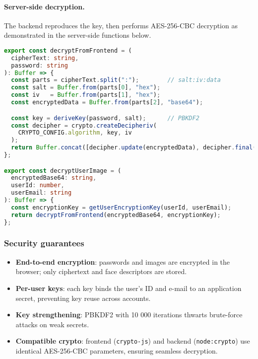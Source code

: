 \clearpage
\paragraph{Server-side decryption.}
The backend reproduces the key, then performs AES-256-CBC decryption as demonstrated in the server-side functions below.

\begin{lstlisting}[language=TypeScript, caption={Server-side decryption of encrypted data from the frontend}, label={lst:server-decryption}]
export const decryptFromFrontend = (
  cipherText: string,
  password: string
): Buffer => {
  const parts = cipherText.split(":");        // salt:iv:data
  const salt = Buffer.from(parts[0], "hex");
  const iv   = Buffer.from(parts[1], "hex");
  const encryptedData = Buffer.from(parts[2], "base64");

  const key = deriveKey(password, salt);      // PBKDF2
  const decipher = crypto.createDecipheriv(
    CRYPTO_CONFIG.algorithm, key, iv
  );
  return Buffer.concat([decipher.update(encryptedData), decipher.final()]);
};

export const decryptUserImage = (
  encryptedBase64: string,
  userId: number,
  userEmail: string
): Buffer => {
  const encryptionKey = getUserEncryptionKey(userId, userEmail);
  return decryptFromFrontend(encryptedBase64, encryptionKey);
};
\end{lstlisting}

\subsubsection{Security guarantees}

\begin{itemize}
  \item \textbf{End-to-end encryption}: passwords and images are encrypted in the browser; only ciphertext and face descriptors are stored.  
  \item \textbf{Per-user keys}: each key binds the user's ID and e-mail to an application secret, preventing key reuse across accounts.  
  \item \textbf{Key strengthening}: PBKDF2 with 10 000 iterations thwarts brute-force attacks on weak secrets.  
  \item \textbf{Compatible crypto}: frontend (\texttt{crypto-js}) and backend (\texttt{node:crypto}) use identical AES-256-CBC parameters, ensuring seamless decryption.  
\end{itemize}


